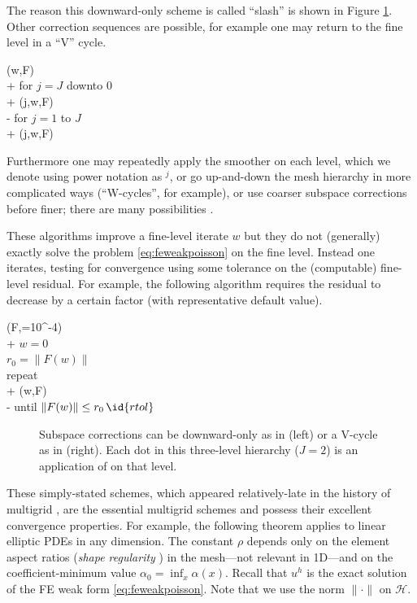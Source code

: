 \documentclass[letterpaper,final,12pt,reqno]{amsart}
\theoremstyle{claim}
\numberwithin{equation}{section}
\numberwithin{figure}{section}
\numberwithin{table}{section}
\begin{document}
The reason this downward-only scheme is called ``slash'' is shown in Figure \ref{fig:msccycles}.  Other correction sequences are possible, for example one may return to the fine level in a ``V'' cycle.
\begin{pseudo*}
(w,F)\text{:} \\+
    for $j=J$ downto $0$ \\+
        (j,w,F) \\-
    for $j=1$ to $J$ \\+
        (j,w,F)
\end{pseudo*}
Furthermore one may repeatedly apply the smoother on each level, which we denote using power notation as $^j$, or go up-and-down the mesh hierarchy in more complicated ways (``W-cycles'', for example), or use coarser subspace corrections before finer; there are many possibilities \cite{Trottenbergetal2001}.

These  algorithms improve a fine-level iterate $w$ but they do not (generally) exactly solve the problem \eqref{eq:feweakpoisson} on the fine level.  Instead one iterates, testing for convergence using some tolerance on the (computable) fine-level residual.  For example, the following algorithm requires the residual to decrease by a certain factor (with representative default value).
\begin{pseudo*}
(F,=10^{-4})\text{:} \\+
    $w=0$ \qquad\qquad\qquad\qquad\qquad {} \\
    $r_0 = \|F(w)\|$ \\
    repeat \\+
        (w,F) \qquad\qquad {} \\-
    until $\|F(w)\| \le r_0\, \id{rtol}$
\end{pseudo*}

\begin{figure}

\caption{Subspace corrections can be downward-only as in  (left) or a V-cycle as in  (right).  Each dot in this three-level hierarchy ($J=2$) is an application of  on that level.}
\label{fig:msccycles}
\end{figure}

These simply-stated schemes, which appeared relatively-late in the history of multigrid \cite{Xu1992}, are the essential multigrid schemes and possess their excellent convergence properties.  For example, the following theorem applies to linear elliptic PDEs in any dimension.  The constant $\rho$ depends only on the element aspect ratios (\emph{shape regularity} \cite{Elmanetal2014}) in the mesh---not relevant in 1D---and on the coefficient-minimum value $\alpha_0=\inf_x \alpha(x)$.  Recall that $u^h$ is the exact solution of the FE weak form \eqref{eq:feweakpoisson}.  Note that we use the norm $\|\cdot\|$ on $\mathcal{H}$.
\end{document}

